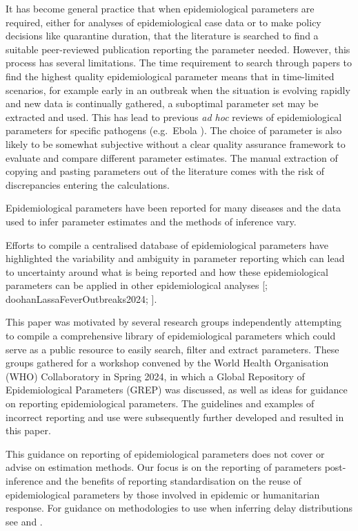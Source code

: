 \documentclass[
  10pt,
  letterpaper,
]{article}
\begin{document}
It has become general practice that when epidemiological parameters are
required, either for analyses of epidemiological case data or to make
policy decisions like quarantine duration, that the literature is
searched to find a suitable peer-reviewed publication reporting the
parameter needed. However, this process has several limitations. The
time requirement to search through papers to find the highest quality
epidemiological parameter means that in time-limited scenarios, for
example early in an outbreak when the situation is evolving rapidly and
new data is continually gathered, a suboptimal parameter set may be
extracted and used. This has lead to previous \emph{ad hoc} reviews of
epidemiological parameters for specific pathogens (e.g.~Ebola
\citep{vankerkhoveReviewEpidemiologicalParameters2015a}). The choice of
parameter is also likely to be somewhat subjective without a clear
quality assurance framework to evaluate and compare different parameter
estimates. The manual extraction of copying and pasting parameters out
of the literature comes with the risk of discrepancies entering the
calculations.

Epidemiological parameters have been reported for many diseases and the
data used to infer parameter estimates and the methods of inference
vary.

Efforts to compile a centralised database of epidemiological parameters
have highlighted the variability and ambiguity in parameter reporting
which can lead to uncertainty around what is being reported and how
these epidemiological parameters can be applied in other epidemiological
analyses {[}\citet{cuomo-dannenburgMarburgVirusDisease2024};
doohanLassaFeverOutbreaks2024; \citet{nashEbolaVirusDisease2024}{]}.

This paper was motivated by several research groups independently
attempting to compile a comprehensive library of epidemiological
parameters which could serve as a public resource to easily search,
filter and extract parameters. These groups gathered for a workshop
convened by the World Health Organisation (WHO) Collaboratory in Spring
2024, in which a Global Repository of Epidemiological Parameters (GREP)
was discussed, as well as ideas for guidance on reporting
epidemiological parameters. The guidelines and examples of incorrect
reporting and use were subsequently further developed and resulted in
this paper.

This guidance on reporting of epidemiological parameters does not cover
or advise on estimation methods. Our focus is on the reporting of
parameters post-inference and the benefits of reporting standardisation
on the reuse of epidemiological parameters by those involved in epidemic
or humanitarian response. For guidance on methodologies to use when
inferring delay distributions see
\citet{parkEstimatingEpidemiologicalDelay2024} and
\citet{charnigaBestPracticesEstimating2024}.
\end{document}
